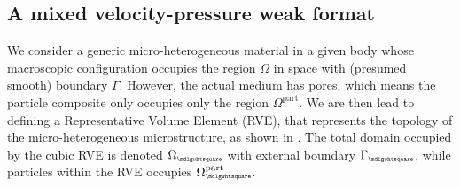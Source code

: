 \documentclass[12pt,a4paper]{article}
\renewcommand{\Box}{\mdlgwhtsquare}
\newcommand{\particle}{\mathrm{part}}
\newcommand{\rve}{
  {\mathchoice
   {\mbox{\scalebox{0.67}{$\Box$}}}
   {\mbox{\scalebox{0.67}{$\Box$}}}
   {\mbox{\scalebox{0.5}{$\Box$}}}
   {\mbox{\scalebox{0.375}{$\Box$}}}
  }
}
\begin{document}
\subsection{A mixed velocity-pressure weak format}

We consider a generic micro-heterogeneous material in a given body whose macroscopic configuration occupies the region $\Omega$ in space with (presumed smooth) boundary $\Gamma$.
However, the actual medium has pores, which means the particle composite only occupies only the region $\Omega^\particle$.
We are then lead to defining a Representative Volume Element (RVE), that represents the topology of the micro-heterogeneous microstructure, as shown in .
The total domain occupied by the cubic RVE is denoted $\Omega_\rve$ with external boundary $\Gamma_\rve$, while particles within the RVE occupies $\Omega_\rve^\particle$.
\end{document}
